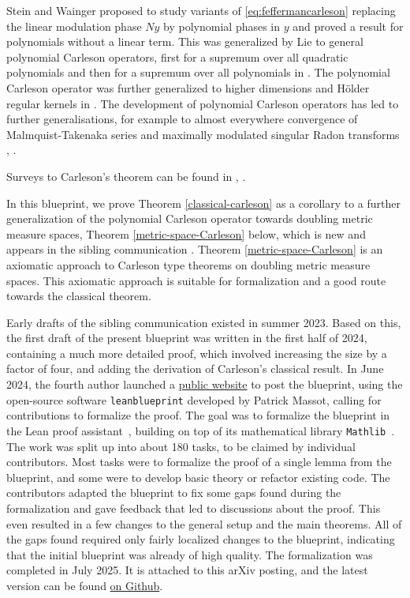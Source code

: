 Stein and Wainger \cite{stein-wainger} proposed to study variants of \eqref{eq:feffermancarleson} replacing the
linear modulation phase $Ny$ by polynomial phases in $y$ and proved a result for polynomials without a linear term.
This was generalized by Lie to general polynomial Carleson operators, first for a supremum over all quadratic
polynomials \cite{lie-quadratic} and then for a supremum over all polynomials in \cite{lie-polynomial}.
The polynomial Carleson operator was further generalized to higher dimensions and H\"older regular kernels in \cite{zk-polynomial}.
The development of polynomial Carleson operators has led to further generalisations, for example to almost everywhere convergence of Malmquist-Takenaka series
\cite{mnatsakanyan} and maximally modulated singular Radon transforms \cite{ramos}, \cite{becker2024maximal}.

Surveys to Carleson's theorem can be found in \cite{MR2091007}, \cite{MR3334208}.

In this blueprint, we prove Theorem \ref{classical-carleson} as a corollary to a further generalization of the polynomial Carleson operator towards doubling metric measure spaces,
Theorem \ref{metric-space-Carleson} below,
which is new and appears in the sibling communication \cite{becker2024carlesonoperatorsdoublingmetric}.
Theorem \ref{metric-space-Carleson} is an axiomatic approach to
Carleson type theorems on doubling metric measure spaces.
This axiomatic approach is suitable for formalization and a good route towards the classical theorem.

Early drafts of the sibling communication \cite{becker2024carlesonoperatorsdoublingmetric} existed in summer 2023.
Based on this, the first draft of the present blueprint was written in the first half of 2024,
containing a much more detailed proof, which involved increasing the size by a factor of four,
and adding the derivation of Carleson's classical result.
In June 2024, the fourth author launched a \href{https://florisvandoorn.com/carleson/}{public website}
to post the blueprint, using the open-source software \texttt{leanblueprint} developed by Patrick Massot,
calling for contributions to formalize the proof.
The goal was to formalize the blueprint in the Lean proof assistant~\cite{moura2021lean},
building on top of its mathematical library \texttt{Mathlib}~\cite{mathlib}.
The work was split up into about 180 tasks, to be claimed by individual contributors.
Most tasks were to formalize the proof of a single lemma from the blueprint, and some were to develop basic theory or refactor existing code.
The contributors adapted the blueprint to fix some gaps found during the formalization and gave feedback that led to discussions about the proof.
This even resulted in a few changes to the general setup and the main theorems.
All of the gaps found required only fairly localized changes to the blueprint, indicating that the initial blueprint was already of high quality.
The formalization was completed in July 2025. It is attached to this arXiv posting, and the latest version can be found \href{https://github.com/fpvandoorn/carleson}{on Github}.

